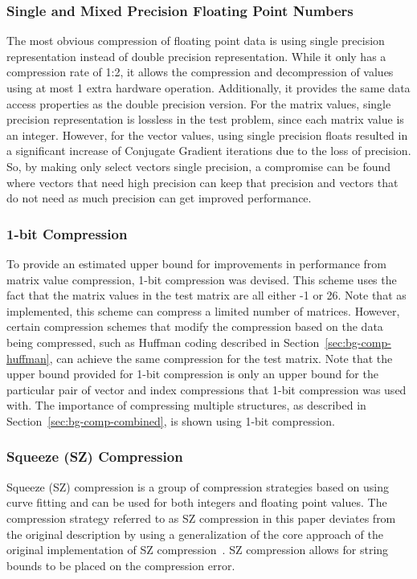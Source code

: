 \subsubsection{Single and Mixed Precision Floating Point Numbers}
\label{sec:bg-comp-floatPrec}
The most obvious compression of floating point data is using single precision representation instead of double precision representation.
While it only has a compression rate of 1:2, it allows the compression and decompression of values using at most 1 extra hardware operation.
Additionally, it provides the same data access properties as the double precision version.
For the matrix values, single precision representation is lossless in the test problem, since each matrix value is an integer.
However, for the vector values, using single precision floats resulted in a significant increase of Conjugate Gradient iterations due to the loss of precision.
So, by making only select vectors single precision, a compromise can be found where vectors that need high precision can keep that precision and vectors that do not need as much precision can get improved performance.

\subsubsection{1-bit Compression}
\label{sec:bg-comp-1bit}
To provide an estimated upper bound for improvements in performance from matrix value compression, 1-bit compression was devised.
This scheme uses the fact that the matrix values in the test matrix are all either -1 or 26.
Note that as implemented, this scheme can compress a limited number of matrices.
However, certain compression schemes that modify the compression based on the data being compressed, such as Huffman coding described in Section~\ref{sec:bg-comp-huffman}, can achieve the same compression for the test matrix.
Note that the upper bound provided for 1-bit compression is only an upper bound for the particular pair of vector and index compressions that 1-bit compression was used with.
The importance of compressing multiple structures, as described in Section~\ref{sec:bg-comp-combined}, is shown using 1-bit compression.

\subsubsection{Squeeze (SZ) Compression}
\label{sec:bg-comp-sz}
Squeeze (SZ) compression is a group of compression strategies based on using curve fitting and can be used for both integers and floating point values.
The compression strategy referred to as SZ compression in this paper deviates from the original description by using a generalization of the core approach of the original implementation of SZ compression~\cite{Di:2016:SZ}.
SZ compression allows for string bounds to be placed on the compression error.

